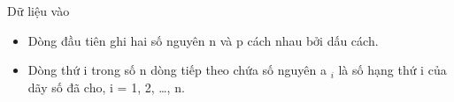 Dữ liệu vào
\begin{itemize}
	\item     Dòng đầu tiên ghi hai số nguyên n và p cách nhau bởi dấu cách.   
	\item     Dòng thứ i trong số n dòng tiếp theo chứa số nguyên a    $_     i    $    là số hạng thứ i của dãy số đã  cho, i = 1, 2, …, n.   
\end{itemize}